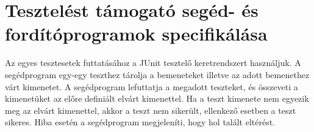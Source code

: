 \section{Tesztelést támogató segéd- és fordítóprogramok specifikálása}

Az egyes tesztesetek futtatásához a JUnit tesztelő keretrendszert használjuk. A segédprogram egy-egy teszthez tárolja a bemeneteket illetve az adott bemenethez várt kimenetet. A segédprogram lefuttatja a megadott teszteket, és összeveti a kimenetüket az előre definiált elvárt kimenettel. Ha a teszt kimenete nem egyezik meg az elvárt kimenettel, akkor a teszt nem sikerült, ellenkező esetben a teszt sikeres. Hiba esetén a segédprogram megjeleníti, hogy hol talált eltérést.

